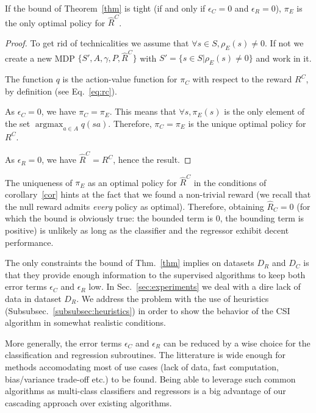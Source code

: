 \documentclass[smallextended]{svjour3}
\newcommand{\argmax}{\operatorname*{argmax}} %
\begin{document}
\begin{corollary}
  \label{cor}
  If the bound of Theorem~\ref{thm} is tight (if and only if $\epsilon_C = 0$ and $\epsilon_R = 0$), $\pi_E$ is the only optimal policy for $\hat R^C$.
\end{corollary}
\begin{proof}
  To get rid of technicalities we assume that $\forall s \in S, \rho_E(s) \neq 0$. If not we create a new MDP $\{S',A,\gamma,P,\hat R^C\}$ with $S' = \{s \in S | \rho_E(s) \neq 0\}$ and work in it.

  The function $q$ is the action-value function for $\pi_C$ with respect to the reward $R^C$, by definition (see Eq.~\ref{eq:rc}).

  As $\epsilon_C = 0$, we have $\pi_C = \pi_E$. This means that $\forall s, \pi_E(s)$ is the only element of the set $\argmax_{a\in A}q(sa)$. Therefore, $\pi_C = \pi_E$ is the unique optimal policy for $R^C$.

  As $\epsilon_R = 0$, we have $\hat R^C = R^C$, hence the result.
\end{proof}
The uniqueness of $\pi_E$ as an optimal policy for $\hat R^C$ in the conditions of corollary~\ref{cor} hints at the fact that we found a non-trivial reward (we recall that the null reward admits \emph{every} policy as optimal). Therefore, obtaining  $\hat{R}_C = 0$ (for which the bound is obviously true: the bounded term is $0$, the bounding term is positive) is unlikely as long as the classifier and the regressor exhibit decent performance.

The only constraints the bound of Thm.~\ref{thm} implies on datasets $D_R$ and $D_C$ is that they provide enough information to the supervised algorithms to keep both error terms $\epsilon_C$ and $\epsilon_R$ low. In Sec.~\ref{sec:experiments} we deal with a dire lack of data in dataset $D_R$. We address the problem with the use of heuristics (Subsubsec.~\ref{subsubsec:heuristics}) in order to show the behavior of the CSI algorithm in somewhat realistic conditions.

More generally, the error terms  $\epsilon_C$ and $\epsilon_R$ can be reduced by a wise choice for the classification and regression subroutines. The litterature is wide enough for methods accomodating most of use cases (lack of data, fast computation, bias/variance trade-off etc.) to be found. Being able to leverage such common algorithms as multi-class classifiers and regressors is a big advantage of our cascading approach over existing algorithms.
\end{document}
